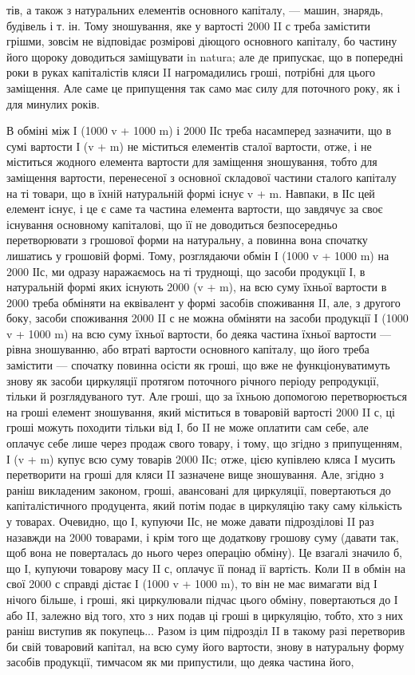 \parcont{}  %
тів, а також з натуральних елементів основного капіталу, — машин,
знарядь, будівель і т. ін. Тому зношування, яке у вартості 2000 II с треба
замістити грішми, зовсім не відповідає розмірові діющого основного
капіталу, бо частину його щороку доводиться заміщувати in natura; але
де припускає, що в попередні роки в руках капіталістів кляси II нагромадились
гроші, потрібні для цього заміщення. Але саме це припущення
так само має силу для поточного року, як і для минулих років.

В обміні між І (1000 v + 1000 m) і 2000 ІІс треба насамперед зазначити,
що в сумі вартости І (v + m) не міститься елементів сталої
вартости, отже, і не міститься жодного елемента вартости для заміщення
зношування, тобто для заміщення вартости, перенесеної з основної
складової частини сталого капіталу на ті товари, що в їхній натуральній
формі існує v + m. Навпаки, в ІІс цей елемент існує, і це є саме та
частина елемента вартости, що завдячує за своє існування основному капіталові,
що її не доводиться безпосередньо перетворювати з грошової
форми на натуральну, а повинна вона спочатку лишатись у грошовій
формі. Тому, розглядаючи обмін І (1000 v + 1000 m) на 2000 ІІс, ми
одразу наражаємось на ті труднощі, що засоби продукції І, в натуральній
формі яких існують 2000 (v + m), на всю суму їхньої вартости в
2000 треба обміняти на еквівалент у формі засобів споживання II, але,
з другого боку, засоби споживання 2000 II с не можна обміняти на засоби
продукції І (1000 v + 1000 m) на всю суму їхньої вартости, бо
деяка частина їхньої вартости — рівна зношуванню, або втраті вартости
основного капіталу, що його треба замістити — спочатку повинна осісти
як гроші, що вже не функціонуватимуть знову як засоби циркуляції
протягом поточного річного періоду репродукції, тільки й розглядуваного
тут. Але гроші, що за їхньою допомогою перетворюється на гроші елемент
зношування, який міститься в товаровій вартості 2000 II с, ці гроші
можуть походити тільки від І, бо II не може оплатити сам себе,
але оплачує себе лише через продаж свого товару, і тому, що згідно
з припущенням, І (v + m) купує всю суму товарів 2000 ІІс; отже, цією
купівлею кляса І мусить перетворити на гроші для кляси II зазначене
вище зношування. Але, згідно з раніш викладеним законом, гроші, авансовані
для циркуляції, повертаються до капіталістичного продуцента,
який потім подає в циркуляцію таку саму кількість у товарах. Очевидно,
що І, купуючи ІІс, не може давати підрозділові II раз назавжди на
2000 товарами, і крім того ще додаткову грошову суму (давати так,
щоб вона не поверталась до нього через операцію обміну). Це взагалі
значило б, що І, купуючи товарову масу II с, оплачує її понад ії вартість.
Коли II в обмін на свої 2000 с справді дістає І (1000 v + 1000 m),
то він не має вимагати від І нічого більше, і гроші, які циркулювали
підчас цього обміну, повертаються до І або II, залежно від того, хто з
них подав ці гроші в циркуляцію, тобто, хто з них раніш виступив як
покупець... Разом із цим підрозділ II в такому разі перетворив би свій
товаровий капітал, на всю суму його вартости, знову в натуральну форму
засобів продукції, тимчасом як ми припустили, що деяка частина його,
\parbreak{}  %

